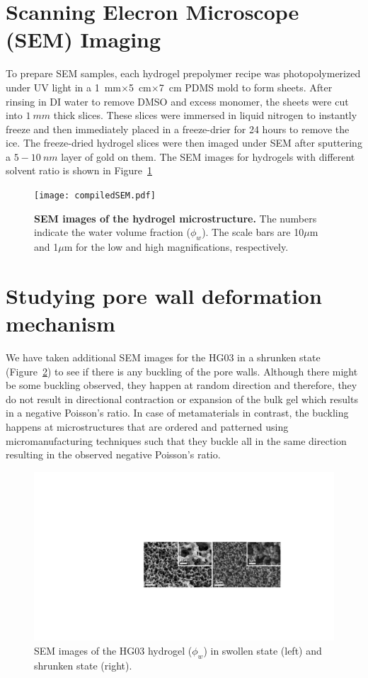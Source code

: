 \section{Scanning Elecron Microscope (SEM) Imaging}
To prepare SEM samples, each hydrogel prepolymer recipe was photopolymerized under UV light in a 1~mm$\times$5~cm$\times$7~cm PDMS mold to form sheets. After rinsing in DI water to remove DMSO and excess monomer, the sheets were cut into $1~mm$ thick slices. These slices were immersed in liquid nitrogen to instantly freeze and then immediately placed in a freeze-drier for 24 hours to remove the ice. The freeze-dried hydrogel slices were then imaged under SEM after sputtering a $5-10~nm$ layer of gold on them. The SEM images for hydrogels with different solvent ratio is shown in Figure~\ref{fig:compiledSEM}

\begin{figure}[!th]
      \centering
      \texttt{[image: compiledSEM.pdf]}
      \caption[SEM images]{\textbf{SEM images of the hydrogel microstructure.} The numbers indicate the water volume fraction ($\phi_w$). The scale bars are 10$\mu$m and 1$\mu$m for the low and high magnifications, respectively.}
      \label{fig:compiledSEM}
\end{figure}

\section{Studying pore wall deformation mechanism}
We have taken additional SEM images for the HG03 in a shrunken state (Figure~\ref{fig:poreDeformation}) to see if there is any buckling of the pore walls. Although there might be some buckling observed, they happen at random direction and therefore, they do not result in directional contraction or expansion of the bulk gel which results in a negative Poisson’s ratio. In case of metamaterials in contrast, the buckling happens at microstructures that are ordered and patterned using micromanufacturing techniques such that they buckle all in the same direction resulting in the observed negative Poisson’s ratio.

\begin{figure}[!th]
      \centering
      \includegraphics[width=\textwidth]{poreDeformation.pdf}
      \caption[SEM images of the HG03 hydrogel]{SEM images of the HG03 hydrogel ($\phi_w$) in swollen state (left) and shrunken state (right).}
      \label{fig:poreDeformation}
\end{figure}

